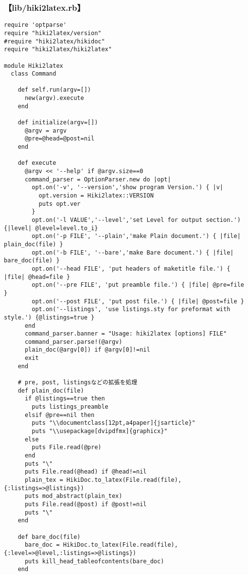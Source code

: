 \subsubsection{【lib/hiki2latex.rb】}\begin{lstlisting}[style=customRuby]
require 'optparse'
require "hiki2latex/version"
#require "hiki2latex/hikidoc"
require "hiki2latex/hiki2latex"

module Hiki2latex
  class Command

    def self.run(argv=[])
      new(argv).execute
    end

    def initialize(argv=[])
      @argv = argv
      @pre=@head=@post=nil
    end

    def execute
      @argv << '--help' if @argv.size==0
      command_parser = OptionParser.new do |opt|
        opt.on('-v', '--version','show program Version.') { |v|
          opt.version = Hiki2latex::VERSION
          puts opt.ver
        }
        opt.on('-l VALUE','--level','set Level for output section.'){|level| @level=level.to_i}
        opt.on('-p FILE', '--plain','make Plain document.') { |file| plain_doc(file) }
        opt.on('-b FILE', '--bare','make Bare document.') { |file| bare_doc(file) }
        opt.on('--head FILE', 'put headers of maketitle file.') { |file| @head=file }
        opt.on('--pre FILE', 'put preamble file.') { |file| @pre=file }
        opt.on('--post FILE', 'put post file.') { |file| @post=file }
        opt.on('--listings', 'use listings.sty for preformat with style.') {@listings=true }
      end
      command_parser.banner = "Usage: hiki2latex [options] FILE"
      command_parser.parse!(@argv)
      plain_doc(@argv[0]) if @argv[0]!=nil
      exit
    end

    # pre, post, listingsなどの拡張を処理
    def plain_doc(file)
      if @listings==true then
        puts listings_preamble
      elsif @pre==nil then
        puts "\\documentclass[12pt,a4paper]{jsarticle}"
        puts "\\usepackage[dvipdfmx]{graphicx}"
      else
        puts File.read(@pre)
      end
      puts "\"
      puts File.read(@head) if @head!=nil
      plain_tex = HikiDoc.to_latex(File.read(file),{:listings=>@listings})
      puts mod_abstract(plain_tex)
      puts File.read(@post) if @post!=nil
      puts "\"
    end

    def bare_doc(file)
      bare_doc = HikiDoc.to_latex(File.read(file),{:level=>@level,:listings=>@listings})
      puts kill_head_tableofcontents(bare_doc)
    end
\end{lstlisting}
